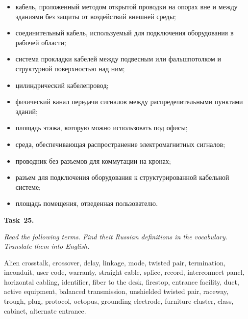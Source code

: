 \begin{itemize}
    \item {кабель, проложенный методом открытой проводки на опорах вне и между зданиями без защиты
    от воздействий внешней среды;}
    \item соединительный кабель, используемый для подключения оборудования в рабочей области;
    \item система прокладки кабелей между подвесным или фальшпотолком и структурной поверхностью над ним;
    \item цилиндрический кабелепровод;
    \item физический канал передачи сигналов между распределительными пунктами зданий;
    \item площадь этажа, которую можно использовать под офисы;
    \item среда, обеспечивающая распространение электромагнитных сигналов;
    \item проводник без разъемов для коммутации на кронах;
    \item разъем для подключения оборудования к структурированной кабельной системе;
    \item площадь помещения, отведенная пользователю.
\end{itemize}

{\bf Task~25.}~~{\it Read the following terms. Find theit Russian definitions in the vocabulary.
Translate them into English. \par}

\noindent Alien crosstalk, crossover, delay, linkage, mode, twisted pair, termination, inconduit, user code,
warranty, straight cable, splice, record, interconnect panel, horizontal cabling, identifier, fiber to the
desk, firestop, entrance facility, duct, active equipment, balanced transmission, unshielded twisted
pair, raceway, trough, plug, protocol, octopus, grounding electrode, furniture cluster, class, cabinet,
alternate entrance.

